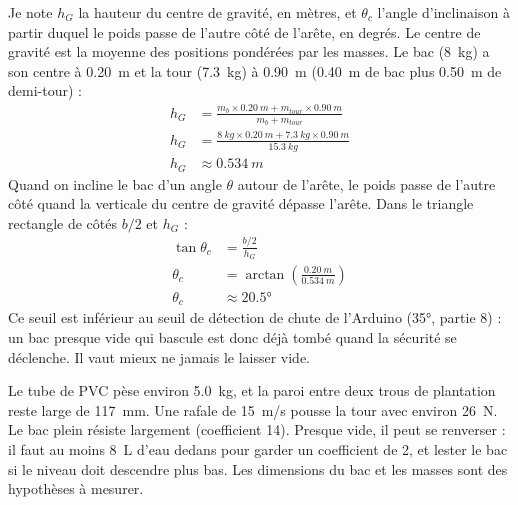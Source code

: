 \begin{demonstration}
Je note $h_G$ la hauteur du centre de gravité, en mètres, et $\theta_c$ l'angle d'inclinaison à partir duquel le poids passe de l'autre côté de l'arête, en degrés. Le centre de gravité est la moyenne des positions pondérées par les masses. Le bac (\qty{8}{kg}) a son centre à \qty{0,20}{m} et la tour (\qty{7,3}{kg}) à \qty{0,90}{m} (\qty{0,40}{m} de bac plus \qty{0,50}{m} de demi-tour) :
\begin{align*}
h_G &= \frac{m_b \times \qty{0,20}{m} + m_{tour} \times \qty{0,90}{m}}{m_b + m_{tour}}\\
h_G &= \frac{\qty{8}{kg} \times \qty{0,20}{m} + \qty{7,3}{kg} \times \qty{0,90}{m}}{\qty{15,3}{kg}}\\
h_G &\approx \qty{0,534}{m}
\end{align*}
Quand on incline le bac d'un angle $\theta$ autour de l'arête, le poids passe de l'autre côté quand la verticale du centre de gravité dépasse l'arête. Dans le triangle rectangle de côtés $b/2$ et $h_G$ :
\begin{align*}
\tan \theta_c &= \frac{b/2}{h_G}\\
\theta_c &= \arctan\!\left(\frac{\qty{0,20}{m}}{\qty{0,534}{m}}\right)\\
\theta_c &\approx \ang{20,5}
\end{align*}
Ce seuil est inférieur au seuil de détection de chute de l'Arduino (\ang{35}, partie 8) : un bac presque vide qui bascule est donc déjà tombé quand la sécurité se déclenche. Il vaut mieux ne jamais le laisser vide.
\end{demonstration}

\begin{aretenir}
Le tube de PVC pèse environ \qty{5,0}{kg}, et la paroi entre deux trous de plantation reste large de \qty{117}{mm}. Une rafale de \qty{15}{m/s} pousse la tour avec environ \qty{26}{N}. Le bac plein résiste largement (coefficient 14). Presque vide, il peut se renverser : il faut au moins \qty{8}{L} d'eau dedans pour garder un coefficient de 2, et lester le bac si le niveau doit descendre plus bas. Les dimensions du bac et les masses sont des hypothèses à mesurer.
\end{aretenir}

